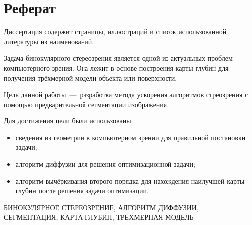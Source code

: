 \chapter*{Реферат}

Диссертация содержит \pageref{LastPage} страницы,
 иллюстраций и список использованной литературы из
 наименований.

Задача бинокулярного стереозрения
является одной из актуальных проблем компьютерного зрения.
Она лежит в основе построения карты глубин для получения трёхмерной
модели объекта или поверхности.

Цель данной работы~---~разработка метода ускорения
алгоритмов стреозрения с помощью
предварительной сегментации изображения.

Для достижения цели были использованы
\begin{itemize}
  \item сведения из геометрии
        в компьютерном зрении для правильной постановки задачи;
  \item алгоритм диффузии для решения оптимизационной задачи;
  \item алгоритм вычёркивания второго порядка для нахождения наилучшей
  карты глубин после решения задачи оптимизации.
\end{itemize}

\MakeUppercase{бинокулярное стереозрение,
               алгоритм диффузии,
               сегментация,
               карта глубин,
               трёхмерная модель}
